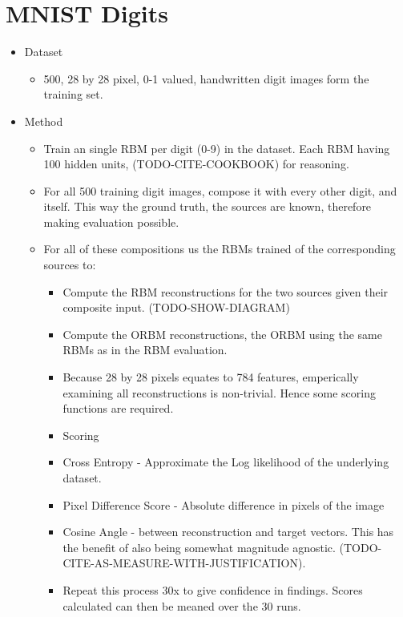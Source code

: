     \section{MNIST Digits}
    \begin{itemize}
      \item Dataset
      \begin{itemize}
        \item 500, 28 by 28 pixel, 0-1 valued, handwritten digit images form the training set.
      \end{itemize}
      \item Method
      \begin{itemize}
        \item Train an single RBM per digit (0-9) in the dataset. Each RBM having 100 hidden units, (TODO-CITE-COOKBOOK) for reasoning.
        \item For all 500 training digit images, compose it with every other digit, and itself. This way the ground truth, the sources are known, therefore making evaluation possible.
        \item For all of these compositions us the RBMs trained of the corresponding sources to:
        \begin{itemize}
          \item Compute the RBM reconstructions for the two sources given their composite input. (TODO-SHOW-DIAGRAM)
          \item Compute the ORBM reconstructions, the ORBM using the same RBMs as in the RBM evaluation.
          \item Because 28 by 28 pixels equates to 784 features, emperically examining all reconstructions is non-trivial. Hence some scoring functions are required.
          \item Scoring
          \item Cross Entropy - Approximate the Log likelihood of the underlying dataset.
          \item Pixel Difference Score - Absolute difference in pixels of the image
          \item Cosine Angle - between reconstruction and target vectors. This has the benefit of also being somewhat magnitude agnostic. (TODO-CITE-AS-MEASURE-WITH-JUSTIFICATION).
          \item Repeat this process 30x to give confidence in findings. Scores calculated can then be meaned over the 30 runs.
        \end{itemize}
      \end{itemize}
    \end{itemize}



